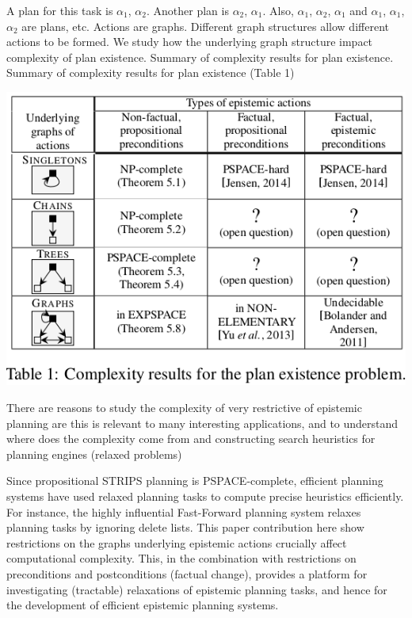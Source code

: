 \documentclass[10pt,legal]{article} %
\begin{document}
\begin{multicols}{2}
A plan for this task is $\alpha_1$, $\alpha_2$. Another plan is $\alpha_2$, $\alpha_1$. Also, $\alpha_1$, $\alpha_2$, $\alpha_1$ and $\alpha_1$, $\alpha_1$, $\alpha_2$ are plans, etc. Actions are graphs. Different graph structures allow different actions to be formed. We study how the underlying graph structure impact complexity of plan existence. Summary of complexity results for plan existence. Summary of complexity results for plan existence (Table 1) \cite{e4e604b96afd4002b1aef671f4ffa495}
\begin{center}
\vspace{1pt}
\includegraphics[width=1.0\linewidth]{complexity.png} %
\vspace{1pt}
\end{center}
There are reasons to study the complexity of very restrictive of epistemic planning are this is relevant to many interesting applications, and to understand where does the complexity come from and constructing search heuristics for planning engines (relaxed problems)

Since propositional STRIPS planning is PSPACE-complete, efficient planning systems have used relaxed
planning tasks to compute precise heuristics efficiently. For instance, the highly influential Fast-Forward planning system relaxes planning tasks by ignoring delete lists. This paper contribution here show restrictions on the graphs underlying epistemic actions crucially affect computational complexity. This, in the combination with restrictions on preconditions and postconditions (factual change), provides a platform for investigating (tractable) relaxations of epistemic planning tasks, and hence for the development of efficient epistemic planning systems.
{}

\end{multicols}
\end{document}

